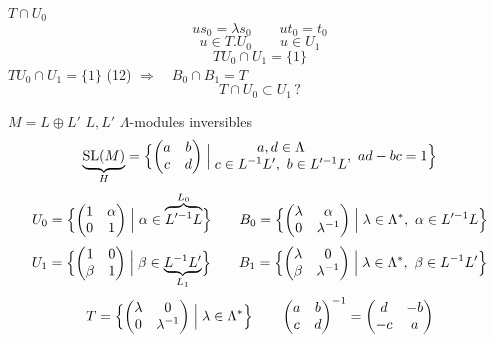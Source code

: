 \documentclass[11pt,a4paper]{article}
\begin{document}
\quad {}\qquad $T \cap U_0$
\[
u s_0 = \lambda s_0 \qquad u t_0 = t_0
\]
\[
u \in T.U_0 \qquad u \in U_1
\]
\[
\boxed{TU_0 \cap U_1 = \{1\}}
\]
$TU_0 \cap U_1 = \{1\}$ (12) \quad {} \quad $\Longrightarrow \quad B_0 \cap B_1 = T$
\[
T \cap U_0 \subset U_1\,?
\]

$M = L \oplus L'$ \qquad \struck{\ill{}} $L, L'$ $\Lambda$-modules inversibles
\[
\underbrace{\mathrm{SL}(M)}_{H} = \Bigl\{ \begin{pmatrix} a & b \\ c & d \end{pmatrix} \Bigm|
\begin{matrix} a, d \in \Lambda \\ c \in L^{-1}L',\ b \in L'^{-1}L \end{matrix},\ ad - bc = 1 \Bigr\}
\]
\[
U_0 = \Bigl\{ \begin{pmatrix} 1 & \alpha \\ 0 & 1 \end{pmatrix} \Bigm| \alpha \in \overbrace{L'^{-1}L}^{L_0} \Bigr\}
\qquad
B_0 = \Bigl\{ \begin{pmatrix} \lambda & \alpha \\ 0 & \lambda^{-1} \end{pmatrix} \Bigm| \lambda \in \Lambda^*,\ \alpha \in L'^{-1}L \Bigr\}
\]
\[
U_1 = \Bigl\{ \begin{pmatrix} 1 & 0 \\ \beta & 1 \end{pmatrix} \Bigm| \beta \in \underbrace{L^{-1}L'}_{L_1} \Bigr\}
\qquad
B_1 = \Bigl\{ \begin{pmatrix} \lambda & 0 \\ \beta & \lambda^{-1} \end{pmatrix} \Bigm| \lambda \in \Lambda^*,\ \beta \in L^{-1}L' \Bigr\}
\]
\[
T = \Bigl\{ \begin{pmatrix} \lambda & 0 \\ 0 & \lambda^{-1} \end{pmatrix} \Bigm| \lambda \in \Lambda^* \Bigr\}
\qquad
\begin{pmatrix} a & b \\ c & d \end{pmatrix}^{-1} = \begin{pmatrix} d & -b \\ -c & a \end{pmatrix}
\]
\end{document}
